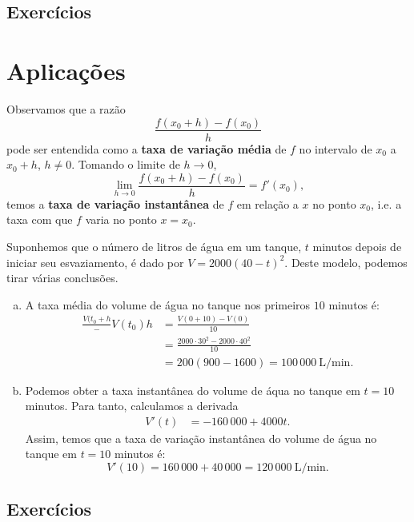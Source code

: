 \begin{ex}
  
\end{ex}

\emconstrucao

\subsection*{Exercícios}

\emconstrucao

\section{Aplicações}\label{cap_deriv_sec_apl}

Observamos que a razão
\begin{equation}
  \frac{f(x_0+h)-f(x_0)}{h}
\end{equation}
pode ser entendida como a {\bf taxa de variação média} de $f$ no intervalo de $x_0$ a $x_0+h$, $h\neq 0$. Tomando o limite de $h\to 0$,
\begin{equation}
  \lim_{h\to 0} \frac{f(x_0+h)-f(x_0)}{h} = f'(x_0),
\end{equation}
temos a {\bf taxa de variação instantânea} de $f$ em relação a $x$ no ponto $x_0$, i.e. a taxa com que $f$ varia no ponto $x=x_0$.

\begin{ex}
  Suponhemos que o número de litros de água em um tanque, $t$ minutos depois de iniciar seu esvaziamento, é dado por $V = 2000(40-t)^2$. Deste modelo, podemos tirar várias conclusões.
  \begin{enumerate}[a)]
  \item A taxa média do volume de água no tanque nos primeiros $10$ minutos é:
    \begin{align}
      \frac{V(t_0+h}-V(t_0){h} &= \frac{V(0+10)-V(0)}{10} \\
                               &= \frac{2000\cdot 30^2-2000\cdot 40^2}{10} \\
                               &= 200(900-1600) = 100\,000 ~ \text{L}/\text{min}.
    \end{align}
  \item Podemos obter a taxa instantânea do volume de áqua no tanque em $t=10$ minutos. Para tanto, calculamos a derivada
    \begin{align}
      V'(t) &= -160\,000 + 4000t. 
    \end{align}
    Assim, temos que a taxa de variação instantânea do volume de água no tanque em $t=10$ minutos é:
    \begin{equation}
      V'(10) = 160\,000+40\,000 = 120\,000 ~\text{L}/\text{min}.
    \end{equation}
  \end{enumerate}
\end{ex}

\emconstrucao

\subsection*{Exercícios}

\emconstrucao